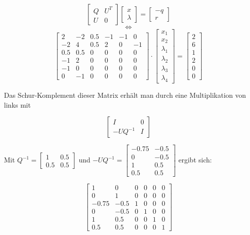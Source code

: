 \documentclass[a4paper, 12pt]{report}
\begin{document}
$$ \begin{bmatrix}Q & U^T\\U & 0\end{bmatrix} \begin{bmatrix}x\\\lambda\end{bmatrix} = \begin{bmatrix}-q\\r\end{bmatrix} $$
$$ \Leftrightarrow $$
$$ \begin{bmatrix}2 & -2 & 0.5 & -1 & -1 & 0\\-2 & 4 & 0.5 & 2 & 0 & -1\\0.5 & 0.5 & 0 & 0 & 0 & 0\\-1 & 2 & 0 & 0 & 0 & 0\\-1 & 0 & 0 & 0 & 0 & 0\\0 & -1 & 0 & 0 & 0 & 0\end{bmatrix} \cdot \begin{bmatrix}x_1\\x_2\\\lambda_1\\\lambda_2\\\lambda_3\\\lambda_4\end{bmatrix} = \begin{bmatrix}2\\6\\1\\2\\0\\0\end{bmatrix} $$

Das Schur-Komplement dieser Matrix erhält man durch eine Multiplikation von links mit

$$ \begin{bmatrix}I & 0\\-UQ^{-1} & I\end{bmatrix} $$

Mit $Q^{-1} = \begin{bmatrix} 1 & 0.5\\ 0.5 & 0.5 \end{bmatrix}$ und $-UQ^{-1} = \begin{bmatrix} -0.75 & -0.5\\0 & -0.5\\1 & 0.5\\0.5 & 0.5 \end{bmatrix}$ ergibt sich:

$$ \begin{bmatrix}1 & 0 & 0 & 0 & 0 & 0\\0 & 1 & 0 & 0 & 0 & 0\\-0.75 & -0.5 & 1 & 0 & 0 & 0\\0 & -0.5 & 0 & 1 & 0 & 0\\1 & 0.5 & 0 & 0 & 1 & 0\\ 0.5 & 0.5 & 0 & 0 & 0 & 1\end{bmatrix} $$
\end{document}
